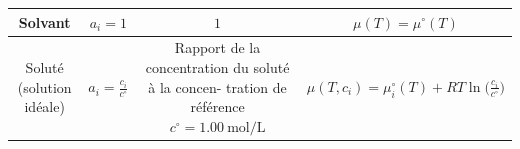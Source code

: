 \documentclass{article}
\newcommand{\ds}{\displaystyle}
\newcommand{\cz}{c^\circ = \SI{1,00}{\mole\per\liter}}
\begin{document}
\begin{table}[H]
\begin{tabular}{|c|c|c|c|}
    \hline
    Solvant & $a_i=1$ & $1$ & $\mu(T) = \mu^\circ(T)$\\
    \hline
    \makecell{Soluté\\(solution idéale)} & $\ds a_i = \frac{c_i}{c^\circ}$ & \makecell{Rapport de la\\concentration du\\soluté à la concen-\\tration de référence\\$\cz$} & $\ds\mu(T,c_i) = \mu_i^\circ(T) + RT\ln\bigg(\frac{c_i}{c^\circ}\bigg)$\\
    \hline
\end{tabular}
\end{table}
\end{document}
